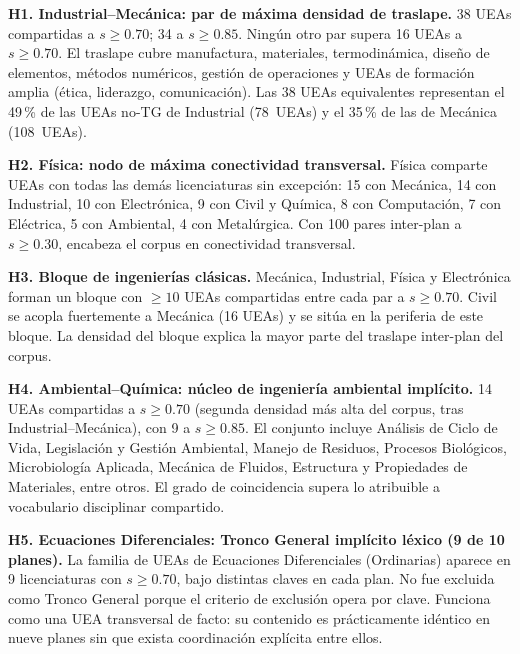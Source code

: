 \documentclass[11pt,a4paper]{article}
\begin{document}
\begin{hallazgo}
\textbf{H1. Industrial--Mecánica: par de máxima densidad de traslape.}
38 UEAs compartidas a $s \geq 0.70$; 34 a $s \geq 0.85$.
Ningún otro par supera 16 UEAs a $s \geq 0.70$.
El traslape cubre manufactura, materiales, termodinámica, diseño de elementos, métodos numéricos, gestión de operaciones y UEAs de formación amplia (ética, liderazgo, comunicación).
Las 38 UEAs equivalentes representan el 49\,\% de las UEAs no-TG de Industrial (78~UEAs) y el 35\,\% de las de Mecánica (108~UEAs).
\end{hallazgo}

\begin{hallazgo}
\textbf{H2. Física: nodo de máxima conectividad transversal.}
Física comparte UEAs con todas las demás licenciaturas sin excepción: 15 con Mecánica, 14 con Industrial, 10 con Electrónica, 9 con Civil y Química, 8 con Computación, 7 con Eléctrica, 5 con Ambiental, 4 con Metalúrgica.
Con 100 pares inter-plan a $s \geq 0.30$, encabeza el corpus en conectividad transversal.
\end{hallazgo}

\begin{hallazgo}
\textbf{H3. Bloque de ingenierías clásicas.}
Mecánica, Industrial, Física y Electrónica forman un bloque con $\geq 10$ UEAs compartidas entre cada par a $s \geq 0.70$.
Civil se acopla fuertemente a Mecánica (16 UEAs) y se sitúa en la periferia de este bloque.
La densidad del bloque explica la mayor parte del traslape inter-plan del corpus.
\end{hallazgo}

\begin{hallazgo}
\textbf{H4. Ambiental--Química: núcleo de ingeniería ambiental implícito.}
14 UEAs compartidas a $s \geq 0.70$ (segunda densidad más alta del corpus, tras Industrial--Mecánica), con 9 a $s \geq 0.85$.
El conjunto incluye Análisis de Ciclo de Vida, Legislación y Gestión Ambiental, Manejo de Residuos, Procesos Biológicos, Microbiología Aplicada, Mecánica de Fluidos, Estructura y Propiedades de Materiales, entre otros.
El grado de coincidencia supera lo atribuible a vocabulario disciplinar compartido.
\end{hallazgo}

\begin{hallazgo}
\textbf{H5. Ecuaciones Diferenciales: Tronco General implícito léxico (9 de 10 planes).}
La familia de UEAs de Ecuaciones Diferenciales (Ordinarias) aparece en 9 licenciaturas con $s \geq 0.70$, bajo distintas claves en cada plan.
No fue excluida como Tronco General porque el criterio de exclusión opera por clave.
Funciona como una UEA transversal de facto: su contenido es prácticamente idéntico en nueve planes sin que exista coordinación explícita entre ellos.
\end{hallazgo}
\end{document}
